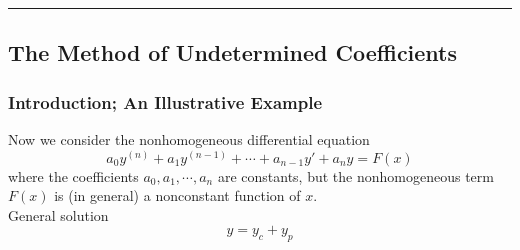 \vspace{20pt}\rule{3in}{1pt}
\subsection{The Method of Undetermined Coefficients}


\subsubsection{Introduction; An Illustrative Example}

Now we consider the nonhomogeneous differential equation
\begin{equation} \label{eq5}
    a_0y^{(n)} + a_1y^{(n-1)} + \cdots + a_{n-1}y' + a_ny = F(x)
\end{equation}
where the coefficients $a_0, a_1, \cdots, a_n$ are constants, but the nonhomogeneous term $F(x)$ is (in general) a nonconstant function of $x$.\\
General solution \[
    y = y_c + y_p
\]

